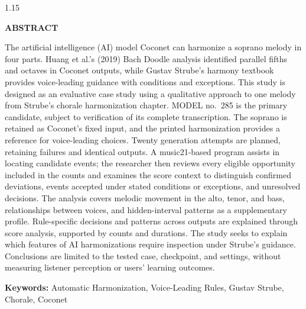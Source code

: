 \newpage
{}
{}
\begin{spacing}{1.15}
\begin{center}
    \textbf{ABSTRACT}
\end{center}

The artificial intelligence (AI) model Coconet can harmonize a soprano melody in four parts. Huang et al.'s (2019) Bach Doodle analysis identified parallel fifths and octaves in Coconet outputs, while Gustav Strube's harmony textbook provides voice-leading guidance with conditions and exceptions. This study is designed as an evaluative case study using a qualitative approach to one melody from Strube's chorale harmonization chapter. MODEL no.~285 is the primary candidate, subject to verification of its complete transcription. The soprano is retained as Coconet’s fixed input, and the printed harmonization provides a reference for voice-leading choices. Twenty generation attempts are planned, retaining failures and identical outputs. A music21-based program assists in locating candidate events; the researcher then reviews every eligible opportunity included in the counts and examines the score context to distinguish confirmed deviations, events accepted under stated conditions or exceptions, and unresolved decisions. The analysis covers melodic movement in the alto, tenor, and bass, relationships between voices, and hidden-interval patterns as a supplementary profile. Rule-specific decisions and patterns across outputs are explained through score analysis, supported by counts and durations. The study seeks to explain which features of AI harmonizations require inspection under Strube's guidance. Conclusions are limited to the tested case, checkpoint, and settings, without measuring listener perception or users' learning outcomes.\par

\noindent\textbf{Keywords:} Automatic Harmonization, Voice-Leading Rules, Gustav Strube, Chorale, Coconet
\end{spacing}
